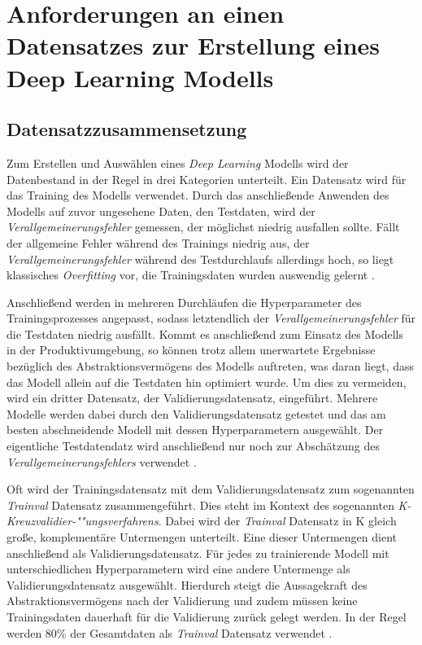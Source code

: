 \section{Anforderungen an einen Datensatzes zur Erstellung eines Deep Learning Modells} \label{data}

\subsection*{Datensatzzusammensetzung}

Zum Erstellen und Auswählen eines \textit{Deep Learning} Modells wird der Datenbestand in der Regel in drei Kategorien unterteilt. Ein Datensatz wird für das Training des Modells verwendet. Durch das anschließende Anwenden des Modells auf zuvor ungesehene Daten, den Testdaten, wird der \textit{Verallgemeinerungsfehler} gemessen, der möglichst niedrig ausfallen sollte. Fällt der allgemeine Fehler während des Trainings niedrig aus, der \textit{Verallgemeinerungsfehler} während des Testdurchlaufs allerdings hoch, so liegt klassisches \textit{Overfitting} vor, die Trainingsdaten wurden auswendig gelernt \cite{AurelienGeron.2018}. 

Anschließend werden in mehreren Durchläufen die Hyperparameter des Trainingsprozesses angepasst, sodass letztendlich der \textit{Verallgemeinerungsfehler} für die Testdaten niedrig ausfällt. Kommt es anschließend zum Einsatz des Modells in der Produktivumgebung, so können trotz allem unerwartete Ergebnisse bezüglich des Abstraktionsvermögens des Modells auftreten, was daran liegt, dass das Modell allein auf die Testdaten hin optimiert wurde. Um dies zu vermeiden, wird ein dritter Datensatz, der Validierungsdatensatz, eingeführt. Mehrere Modelle werden dabei durch den Validierungsdatensatz getestet und das am besten abschneidende Modell mit dessen Hyperparametern ausgewählt. Der eigentliche Testdatendatz wird anschließend nur noch zur Abschätzung des \textit{Verallgemeinerungsfehlers} verwendet \cite{AurelienGeron.2018}. 

Oft wird der Trainingsdatensatz mit dem Validierungsdatensatz zum sogenannten \textit{Trainval} Datensatz zusammengeführt. Dies steht im Kontext des sogenannten \textit{K-Kreuzvalidier-""ungsverfahrens}. Dabei wird der \textit{Trainval} Datensatz in K gleich große, komplementäre Untermengen unterteilt. Eine dieser Untermengen dient anschließend als Validierungsdatensatz. Für jedes zu trainierende Modell mit unterschiedlichen Hyperparametern wird eine andere Untermenge als Validierungsdatensatz ausgewählt. Hierdurch steigt die Aussagekraft des Abstraktionsvermögens nach der Validierung und zudem müssen keine Trainingsdaten dauerhaft für die Validierung zurück gelegt werden. In der Regel werden 80\% der Gesamtdaten als \textit{Trainval} Datensatz verwendet \cite{AurelienGeron.2018}.

